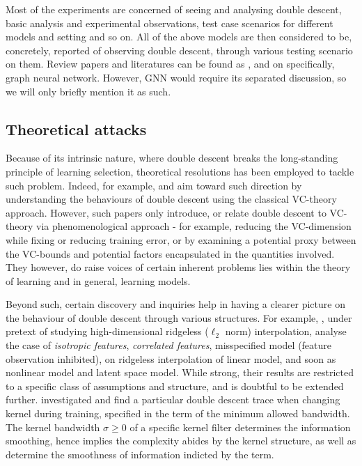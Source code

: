 Most of the experiments are concerned of seeing and analysing double descent, basic analysis and experimental observations, test case scenarios for different models and setting and so on. All of the above models are then considered to be, concretely, reported of observing double descent, through various testing scenario on them. Review papers and literatures can be found as \cite{schaeffer_double_2023,ErdongHu2021}, and \cite{shi2024homophilymodulatesdoubledescent} on specifically, graph neural network. However, GNN would require its separated discussion, so we will only briefly mention it as such. 

\subsection{Theoretical attacks}

Because of its intrinsic nature, where double descent breaks the long-standing principle of learning selection, theoretical resolutions has been employed to tackle such problem. Indeed, for example, \cite{cherkassky2024understand} and \cite{lee2022vctheoreticalexplanationdouble} aim toward such direction by understanding the behaviours of double descent using the classical VC-theory approach. However, such papers only introduce, or relate double descent to VC-theory via phenomenological approach - for example, reducing the VC-dimension while fixing or reducing training error, or by examining a potential proxy between the VC-bounds and potential factors encapsulated in the quantities involved. They however, do raise voices of certain inherent problems lies within the theory of learning and in general, learning models. 

Beyond such, certain discovery and inquiries help in having a clearer picture on the behaviour of double descent through various structures. For example, \cite{hastie2019surprises}, under pretext of studying high-dimensional ridgeless ($\ell_{2}$ norm) interpolation, analyse the case of \textit{isotropic features}, \textit{correlated features}, misspecified model (feature observation inhibited), on ridgeless interpolation of linear model, and soon as nonlinear model and latent space model. While strong, their results are restricted to a specific class of assumptions and structure, and is doubtful to be extended further. \cite{allerbo2025changingkerneltrainingleads} investigated and find a particular double descent trace when changing kernel during training, specified in the term of the minimum allowed bandwidth. The kernel bandwidth $\sigma\geq 0$ of a specific kernel filter determines the information smoothing, hence implies the complexity abides by the kernel structure, as well as determine the smoothness of information indicted by the term. 


